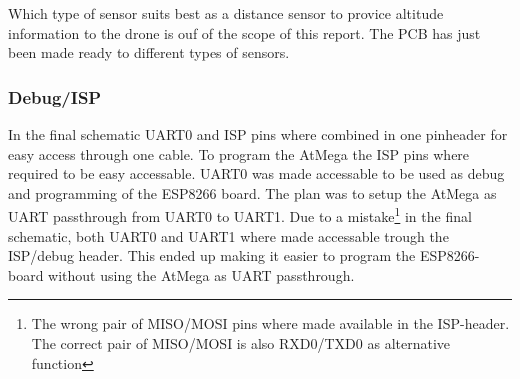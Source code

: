 Which type of sensor suits best as a distance sensor to provice altitude information to the drone is ouf of the scope of this report. The PCB has just been made ready to different types of sensors.

\subsubsection{Debug/ISP}
In the final schematic UART0 and ISP pins where combined in one pinheader for easy access through one cable. 
To program the AtMega the ISP pins where required to be easy accessable. 
UART0 was made accessable to be used as debug and programming of the ESP8266 board.
The plan was to setup the AtMega as UART passthrough from UART0 to UART1.
Due to a mistake\footnote{The wrong pair of MISO/MOSI pins where made available in the ISP-header. The correct pair of MISO/MOSI is also RXD0/TXD0 as alternative function} in the final schematic, both UART0 and UART1 where made accessable trough the ISP/debug header. 
This ended up making it easier to program the ESP8266-board without using the AtMega as UART passthrough.
